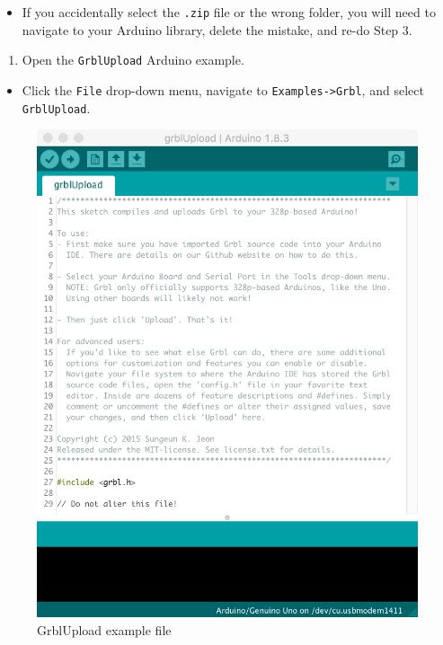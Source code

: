 \documentclass[]{book}
\providecommand{\tightlist}{%
  \setlength{\itemsep}{0pt}\setlength{\parskip}{0pt}}
\theoremstyle{definition}
\theoremstyle{definition}
\theoremstyle{remark}
\begin{document}
\begin{itemize}
\tightlist
\item
  If you accidentally select the \texttt{.zip} file or the wrong folder,
  you will need to navigate to your Arduino library, delete the mistake,
  and re-do Step 3.
\end{itemize}

\begin{enumerate}
\def\labelenumi{\arabic{enumi}.}
\setcounter{enumi}{3}
\tightlist
\item
  Open the \texttt{GrblUpload} Arduino example.
\end{enumerate}

\begin{itemize}
\tightlist
\item
  Click the \texttt{File} drop-down menu, navigate to
  \texttt{Examples-\textgreater{}Grbl}, and select \texttt{GrblUpload}.
\end{itemize}

\begin{figure}

{\centering \includegraphics[width=0.75\linewidth]{images/grbl_upload_file} 

}

\caption{GrblUpload example file}\label{fig:grblUploadFile}
\end{figure}
\end{document}
